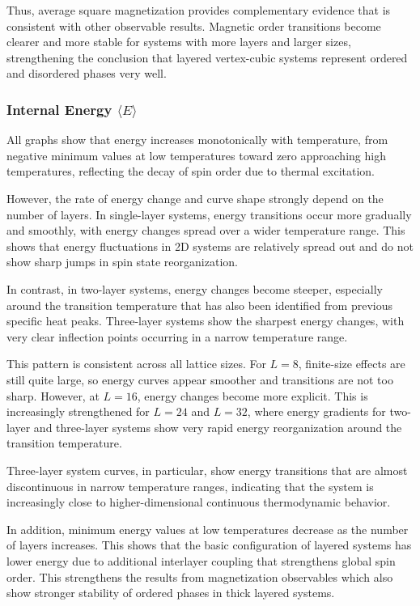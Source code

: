Thus, average square magnetization provides complementary evidence that is consistent with other observable results. Magnetic order transitions become clearer and more stable for systems with more layers and larger sizes, strengthening the conclusion that layered vertex-cubic systems represent ordered and disordered phases very well.

\subsubsection{Internal Energy $\langle E \rangle$}

All graphs show that energy increases monotonically with temperature, from negative minimum values at low temperatures toward zero approaching high temperatures, reflecting the decay of spin order due to thermal excitation.

However, the rate of energy change and curve shape strongly depend on the number of layers. In single-layer systems, energy transitions occur more gradually and smoothly, with energy changes spread over a wider temperature range. This shows that energy fluctuations in 2D systems are relatively spread out and do not show sharp jumps in spin state reorganization.

In contrast, in two-layer systems, energy changes become steeper, especially around the transition temperature that has also been identified from previous specific heat peaks. Three-layer systems show the sharpest energy changes, with very clear inflection points occurring in a narrow temperature range.

This pattern is consistent across all lattice sizes. For $L = 8$, finite-size effects are still quite large, so energy curves appear smoother and transitions are not too sharp. However, at $L = 16$, energy changes become more explicit. This is increasingly strengthened for $L = 24$ and $L = 32$, where energy gradients for two-layer and three-layer systems show very rapid energy reorganization around the transition temperature.

Three-layer system curves, in particular, show energy transitions that are almost discontinuous in narrow temperature ranges, indicating that the system is increasingly close to higher-dimensional continuous thermodynamic behavior.

In addition, minimum energy values at low temperatures decrease as the number of layers increases. This shows that the basic configuration of layered systems has lower energy due to additional interlayer coupling that strengthens global spin order. This strengthens the results from magnetization observables which also show stronger stability of ordered phases in thick layered systems.


